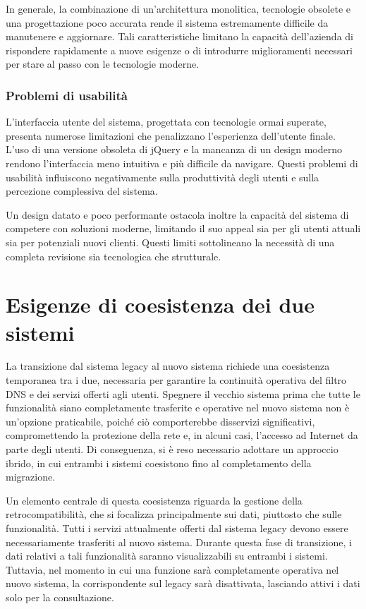 In generale, la combinazione di un'architettura monolitica, tecnologie obsolete e una progettazione poco accurata rende il sistema estremamente difficile da manutenere e aggiornare. Tali caratteristiche limitano la capacità dell'azienda di rispondere rapidamente a nuove esigenze o di introdurre miglioramenti necessari per stare al passo con le tecnologie moderne.

\subsubsection{Problemi di usabilità}
L'interfaccia utente del sistema, progettata con tecnologie ormai superate, presenta numerose limitazioni che penalizzano l’esperienza dell’utente finale. L’uso di una versione obsoleta di jQuery e la mancanza di un design moderno rendono l’interfaccia meno intuitiva e più difficile da navigare. Questi problemi di usabilità influiscono negativamente sulla produttività degli utenti e sulla percezione complessiva del sistema.

Un design datato e poco performante ostacola inoltre la capacità del sistema di competere con soluzioni moderne, limitando il suo appeal sia per gli utenti attuali sia per potenziali nuovi clienti. Questi limiti sottolineano la necessità di una completa revisione sia tecnologica che strutturale.

\section{Esigenze di coesistenza dei due sistemi}
La transizione dal sistema legacy al nuovo sistema richiede una coesistenza temporanea tra i due, necessaria per garantire la continuità operativa del filtro DNS e dei servizi offerti agli utenti. Spegnere il vecchio sistema prima che tutte le funzionalità siano completamente trasferite e operative nel nuovo sistema non è un’opzione praticabile, poiché ciò comporterebbe disservizi significativi, compromettendo la protezione della rete e, in alcuni casi, l'accesso ad Internet da parte degli utenti. Di conseguenza, si è reso necessario adottare un approccio ibrido, in cui entrambi i sistemi coesistono fino al completamento della migrazione.

Un elemento centrale di questa coesistenza riguarda la gestione della retrocompatibilità, che si focalizza principalmente sui dati, piuttosto che sulle funzionalità. Tutti i servizi attualmente offerti dal sistema legacy devono essere necessariamente trasferiti al nuovo sistema. Durante questa fase di transizione, i dati relativi a tali funzionalità saranno visualizzabili su entrambi i sistemi. Tuttavia, nel momento in cui una funzione sarà completamente operativa nel nuovo sistema, la corrispondente sul legacy sarà disattivata, lasciando attivi i dati solo per la consultazione.


